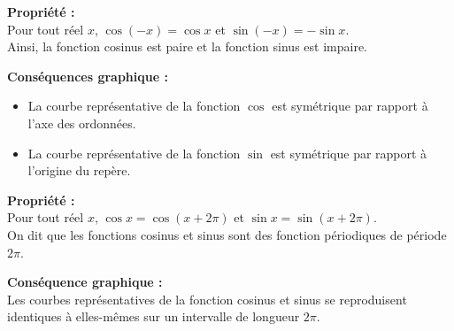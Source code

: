 \documentclass[11pt,a4paper]{article}
\begin{document}
\begin{mdframed}[style=proprieteStyle]
    \textbf{Propriété :} ~\\
    Pour tout réel $x$, $\cos(-x)=\cos{x}$ et $\sin(-x)=-\sin{x}$. \\
    Ainsi, la fonction cosinus est paire et la fonction sinus est impaire.
\end{mdframed}

\textbf{Conséquences graphique :}
\vspace{-4pt}
\begin{itemize}
    \item La courbe représentative de la fonction $\cos$ est symétrique par rapport à l'axe des ordonnées.
    \item La courbe représentative de la fonction $\sin$ est symétrique par rapport à l'origine du repère.
\end{itemize}

\begin{mdframed}[style=proprieteStyle]
    \textbf{Propriété :} ~\\
    Pour tout réel $x$, $\cos{x}=\cos(x+2\pi)$ et $\sin{x}=\sin(x+2\pi)$.\\
    On dit que les fonctions cosinus et sinus sont des fonction périodiques de période $2\pi$.
\end{mdframed}

\textbf{Conséquence graphique :} ~\\
Les courbes représentatives de la fonction cosinus et sinus se reproduisent identiques à elles-mêmes sur un intervalle de longueur $2\pi$.
\end{document}
